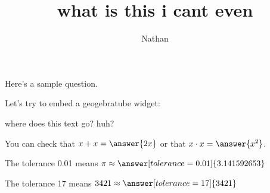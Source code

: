 \documentclass{ximera}
\title{what is this i cant even}
\author{Nathan}
\begin{document}
\maketitle

Here's a sample question.

\begin{problem}
\begin{multipleChoice}
\end{multipleChoice}
\end{problem}

Let's try to embed a geogebratube widget:




where does this text go? huh?

\begin{problem}
   You can check that $x + x = \answer{2x}$ or that $x \cdot x = \answer{x^2}$.
\end{problem}

\begin{problem}
   The tolerance 0.01 means $\pi \approx \answer[tolerance=0.01]{3.141592653}$
\end{problem}

\begin{problem}
   The tolerance 17 means $3421 \approx \answer[tolerance=17]{3421}$
\end{problem}
\end{document}
